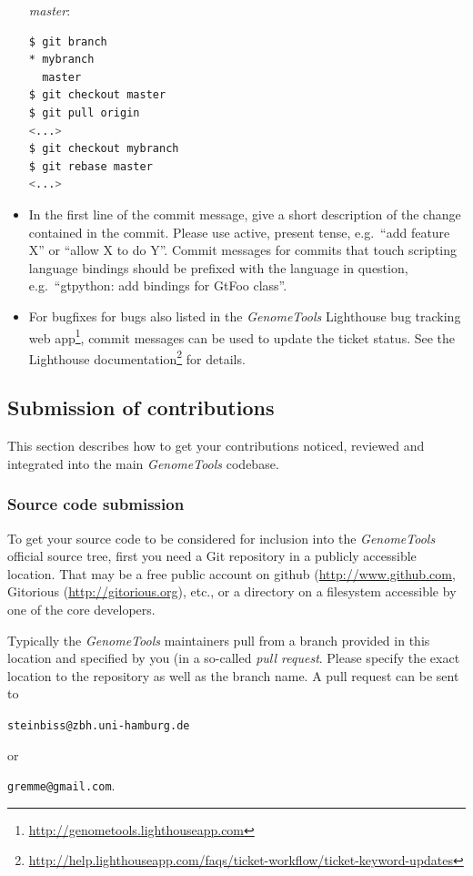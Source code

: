 \documentclass[11pt,final]{article}
\newcommand{\Gt}[0]{\emph{GenomeTools}\xspace}
\begin{document}
\begin{itemize}
\emph{master}:
    \begin{lstlisting}[language=sh]
$ git branch
* mybranch
  master
$ git checkout master
$ git pull origin
<...>
$ git checkout mybranch
$ git rebase master
<...>
    \end{lstlisting}%
\item
In the first line of the commit message, give a short description of the
change contained in the commit.  Please use active, present tense,
e.g.\ ``add feature X'' or ``allow X to do Y''.
Commit messages for commits that touch scripting
language bindings should be prefixed with the language in question,
e.g.\ ``gtpython: add bindings for GtFoo class''.
\item
For bugfixes for bugs also listed in the \Gt Lighthouse bug tracking web
app\footnote{\url{http://genometools.lighthouseapp.com}}, commit messages can
be used to update the ticket status. See the Lighthouse
documentation\footnote{\url{http://help.lighthouseapp.com/faqs/ticket-workflow/ticket-keyword-updates}} 
for details.
\end{itemize}

\subsection{Submission of contributions}

This section describes how to get your contributions noticed, reviewed and
integrated into the main \Gt codebase.

\subsubsection{Source code submission}

To get your source code to be considered for inclusion into the \Gt official
source tree, first you need a Git repository in a publicly accessible location.
That may be a free public account on github (\url{http://www.github.com},
Gitorious (\url{http://gitorious.org}), etc., or a directory on a filesystem
accessible by one of the core developers.

Typically the \Gt maintainers pull from a branch provided in this location and
specified by you (in a so-called \emph{pull request}. Please specify the exact
location to the repository as well as the branch name. A pull request can be
sent to

\centerline{\texttt{steinbiss@zbh.uni-hamburg.de}}

or

\centerline{\texttt{gremme@gmail.com}.}
\end{document}
